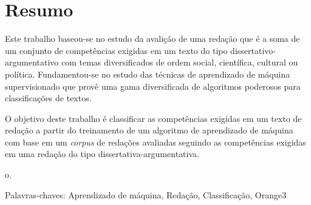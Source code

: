 \chapter*{Resumo}

\noindent Este trabalho baseou-se no estudo da avalição de uma redação que é a 
soma de um conjunto de competências exigidas em um texto do tipo 
dissertativo-argumentativo com temas diversificados de ordem social, 
científica, cultural ou política. Fundamentou-se no estudo das técnicas de 
aprendizado de máquina supervisionado que provê uma gama diversificada de 
algoritmos poderosos para classificações de textos.

O objetivo deste trabalho é classificar as competências exigidas em um texto de 
redação a partir do treinamento de um algoritmo de aprendizado de máquina com
base em um \textit{corpus} de redações avaliadas seguindo as competências exigidas em 
uma redação do tipo dissertativa-argumentativa.


o.

Palavras-chaves: Aprendizado de máquina, Redação, Classificação, Orange3
    